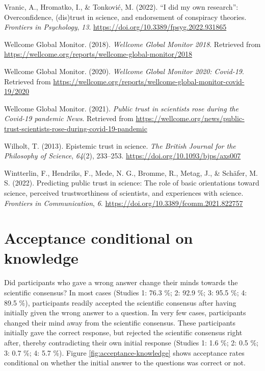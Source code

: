 \documentclass[
  doc,floatsintext]{apa6}
\newlength{\cslhangindent}
\newenvironment{CSLReferences}[2] %
 {\begin{list}{}{%
  \setlength{\itemindent}{0pt}
  \setlength{\leftmargin}{0pt}
  \setlength{\parsep}{0pt}
  \ifodd #1
   \setlength{\leftmargin}{\cslhangindent}
   \setlength{\itemindent}{-1\cslhangindent}
  \fi
  \setlength{\itemsep}{#2\baselineskip}}}
 {\end{list}}
\begin{document}
\begin{CSLReferences}{1}{0}
Vranic, A., Hromatko, I., \& Tonković, M. (2022). {``}I did my own research{''}: Overconfidence, (dis)trust in science, and endorsement of conspiracy theories. \emph{Frontiers in Psychology}, \emph{13}. \url{https://doi.org/10.3389/fpsyg.2022.931865}

Wellcome Global Monitor. (2018). \emph{Wellcome Global Monitor 2018}. Retrieved from \url{https://wellcome.org/reports/wellcome-global-monitor/2018}

Wellcome Global Monitor. (2020). \emph{Wellcome Global Monitor 2020: Covid-19}. Retrieved from \url{https://wellcome.org/reports/wellcome-global-monitor-covid-19/2020}

Wellcome Global Monitor. (2021). \emph{Public trust in scientists rose during the Covid-19 pandemic \textbar{} News}. Retrieved from \url{https://wellcome.org/news/public-trust-scientists-rose-during-covid-19-pandemic}

Wilholt, T. (2013). Epistemic trust in science. \emph{The British Journal for the Philosophy of Science}, \emph{64}(2), 233--253. \url{https://doi.org/10.1093/bjps/axs007}

Wintterlin, F., Hendriks, F., Mede, N. G., Bromme, R., Metag, J., \& Schäfer, M. S. (2022). Predicting public trust in science: The role of basic orientations toward science, perceived trustworthiness of scientists, and experiences with science. \emph{Frontiers in Communication}, \emph{6}. \url{https://doi.org/10.3389/fcomm.2021.822757}

\end{CSLReferences}

\newpage

\newpage

\appendix


\section{Acceptance conditional on knowledge}\label{acceptance-knowledge}

Did participants who gave a wrong answer change their minds towards the scientific consensus? In most cases (Studies 1: 76.3 \%; 2: 92.9 \%; 3: 95.5 \%; 4: 89.5 \%), participants readily accepted the scientific consensus after having initially given the wrong answer to a question. In very few cases, participants changed their mind away from the scientific consensus. These participants initially gave the correct response, but rejected the scientific consensus right after, thereby contradicting their own initial response (Studies 1: 1.6 \%; 2: 0.5 \%; 3: 0.7 \%; 4: 5.7 \%). Figure \ref{fig:acceptance-knowledge} shows acceptance rates conditional on whether the initial answer to the questions was correct or not.
\end{document}
